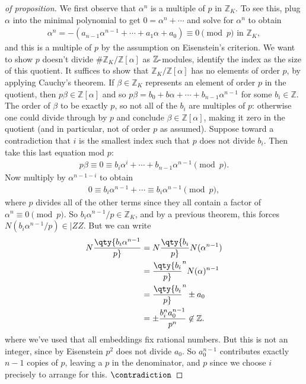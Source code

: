 \begin{proof}[of proposition]

We first observe that \(\alpha^n\) is a multiple of \(p\) in
\({\mathbb{Z}}_K\). To see this, plug \(\alpha\) into the minimal
polynomial to get \(0 = \alpha^n + \cdots\) and solve for \(\alpha^n\)
to obtain
\begin{align*}
\alpha^n = -(a_{n-1} \alpha^{n-1} + \cdots + a_1 \alpha + a_0) \equiv 0 \pmod p \text{ in } {\mathbb{Z}}_K 
,\end{align*}
and this is a multiple of \(p\) by the assumption on Eisenstein's
criterion. We want to show \(p\) doesn't divide
\(\# {\mathbb{Z}}_K/ {\mathbb{Z}}[ \alpha]\) as
\({\mathbb{Z}}{\hbox{-}}\)modules, identify the index as the size of
this quotient. It suffices to show that
\({\mathbb{Z}}_K/{\mathbb{Z}}[ \alpha]\) has no elements of order \(p\),
by applying Cauchy's theorem. If \(\beta\in {\mathbb{Z}}_K\) represents
an element of order \(p\) in the quotient, then
\(p \beta\in {\mathbb{Z}}[ \alpha]\) and so
\(p \beta = b_0 + b \alpha + \cdots + b_{n-1} \alpha^{n-1}\) for some
\(b_i \in {\mathbb{Z}}\). The order of \(\beta\) to be exactly \(p\), so
not all of the \(b_i\) are multiples of \(p\): otherwise one could
divide through by \(p\) and conclude \(\beta\in {\mathbb{Z}}[ \alpha]\),
making it zero in the quotient (and in particular, not of order \(p\) as
assumed). Suppose toward a contradiction that \(i\) is the smallest
index such that \(p\) does not divide \(b_i\). Then take this last
equation mod \(p\):
\begin{align*}
p \beta \equiv 0 \equiv b_i \alpha^{i} + \cdots + b_{n-1} \alpha^{n-1} \pmod p
.\end{align*}
Now multiply by \(\alpha^{n-1-i}\) to obtain
\begin{align*}
0 \equiv b_i \alpha^{n-1} + \cdots \equiv b_i \alpha^{n-1} \pmod p
,\end{align*}
where \(p\) divides all of the other terms since they all contain a
factor of \(\alpha^n \equiv 0 \pmod p\). So
\(b_i \alpha^{n-1} /p \in {\mathbb{Z}}_K\), and by a previous theorem,
this forces \(N( b_i \alpha^{n-1} / p ) \in |ZZ\). But we can write
\begin{align*}
N \qty{ b_i \alpha^{n-1} \over p }
&=
N \qty{ b_i \over p} N( \alpha^{n-1} ) \\
&= \qty{b_i \over p}^{n} N( \alpha)^{n-1} \\
&= \qty{b_i \over p}^{n} \pm a_0 \\
&= \pm {b_i^n a_0^{n-1} \over p^n } \not\in {\mathbb{Z}}
.\end{align*}
where we've used that all embeddings fix rational numbers. But this is
not an integer, since by Eisenstein \(p^2\) does not divide \(a_0\). So
\(a_0^{n-1}\) contributes exactly \(n-1\) copies of \(p\), leaving a
\(p\) in the denominator, and
\(p%
\) since we choose \(i\) precisely to arrange for this.
\(\contradiction\)

\end{proof}

